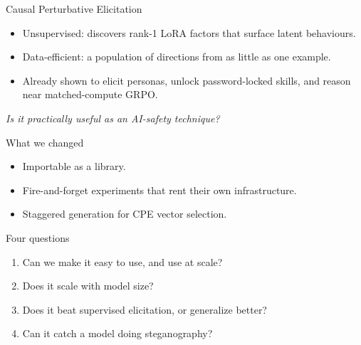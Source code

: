 \begin{frame}{Causal Perturbative Elicitation}
  \begin{itemize}
    \item Unsupervised: discovers rank-1 LoRA factors that surface latent behaviours.
    \item Data-efficient: a population of directions from as little as one example.
    \item Already shown to elicit personas, unlock password-locked skills, and reason near matched-compute GRPO.
  \end{itemize}
  \vfill
  \begin{center}
    \emph{Is it practically useful as an AI-safety technique?}
  \end{center}
\end{frame}

\begin{frame}{What we changed}
  \begin{itemize}
    \item Importable as a library.
    \item Fire-and-forget experiments that rent their own infrastructure.
    \item Staggered generation for CPE vector selection.
  \end{itemize}
\end{frame}

\begin{frame}{Four questions}
  \begin{enumerate}
    \item Can we make it easy to use, and use at scale?
    \item Does it scale with model size?
    \item Does it beat supervised elicitation, or generalize better?
    \item Can it catch a model doing steganography?
  \end{enumerate}
\end{frame}
